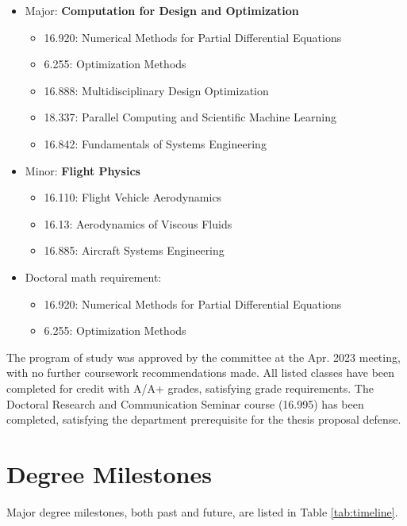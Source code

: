 \documentclass[12pt,vi,oneside]{report}
\begin{document}
    \begin{itemize}[noitemsep]
        \item Major: \textbf{Computation for Design and Optimization}
        \begin{itemize}[noitemsep]
            \item 16.920: Numerical Methods for Partial Differential Equations
            \item 6.255: Optimization Methods
            \item 16.888: Multidisciplinary Design Optimization
            \item 18.337: Parallel Computing and Scientific Machine Learning
            \item 16.842: Fundamentals of Systems Engineering
        \end{itemize}
        \item Minor: \textbf{Flight Physics}
        \begin{itemize}[noitemsep]
            \item 16.110: Flight Vehicle Aerodynamics
            \item 16.13: Aerodynamics of Viscous Fluids
            \item 16.885: Aircraft Systems Engineering
        \end{itemize}
        \item Doctoral math requirement:
        \begin{itemize}[noitemsep]
            \item 16.920: Numerical Methods for Partial Differential Equations
            \item 6.255: Optimization Methods
        \end{itemize}
    \end{itemize}

    \noindent The program of study was approved by the committee at the Apr. 2023 meeting, with no further coursework recommendations made. All listed classes have been completed for credit with A/A+ grades, satisfying grade requirements. The Doctoral Research and Communication Seminar course (16.995) has been completed, satisfying the department prerequisite for the thesis proposal defense.


    \section{Degree Milestones}

    Major degree milestones, both past and future, are listed in Table \ref{tab:timeline}.
\end{document}
